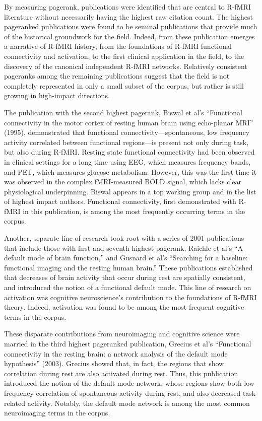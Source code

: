 \documentclass[12pt,3p,review,number]{elsarticle}
\begin{document}
By measuring pagerank, publications were identified that are central to R-fMRI
literature without necessarily having the highest raw citation count. The
highest pageranked publications were found to be seminal publications that
provide much of the historical groundwork for the field. Indeed, from these
publication emerges a narrative of R-fMRI history, from the foundations of
R-fMRI functional connectivity and activation, to the first clinical application
in the field, to the discovery of the canonical independent R-fMRI networks.
Relatively consistent pageranks among the remaining publications suggest that
the field is not completely represented in only a small subset of the corpus,
but rather is still growing in high-impact directions. 

The publication with the second highest pagerank, Biswal et al’s ``Functional
connectivity in the motor cortex of resting human brain using echo-planar MRI''
(1995), demonstrated that functional connectivity—spontaneous, low frequency
activity correlated between functional regions—is present not only during task,
but also during R-fMRI. Resting state functional connectivity had been observed
in clinical settings for a long time using EEG, which measures frequency bands,
and PET, which measures glucose metabolism. However, this was the first time it
was observed in the complex fMRI-measured BOLD signal, which lacks clear
physiological underpinning. Biswal appears in a top working group and in the
list of highest impact authors. Functional connectivity, first demonstrated with
R-fMRI in this publication, is among the most frequently occurring terms in the
corpus. 

Another, separate line of research took root with a series of 2001 publications
that include those with first and seventh highest pagerank, Raichle et al’s ``A
default mode of brain function,'' and Gusnard et al’s ``Searching for a baseline:
functional imaging and the resting human brain.'' These publications established
that decreases of brain activity that occur during rest are spatially
consistent, and introduced the notion of a functional default mode. This line of
research on activation was cognitive neuroscience’s contribution to the
foundations of R-fMRI theory. Indeed, activation was found to be among the most
frequent cognitive terms in the corpus.

These disparate contributions from neuroimaging and cognitive science were
married in the third highest pageranked publication, Grecius et al’s ``Functional
connectivity in the resting brain: a network analysis of the default mode
hypothesis'' (2003). Grecius showed that, in fact, the regions that show
correlation during rest are also activated during rest. Thus, this publication
introduced the notion of the default mode network, whose regions show both low
frequency correlation of spontaneous activity during rest, and also decreased
task-related activity. Notably, the default mode network is among the most
common neuroimaging terms in the corpus.
\end{document}

